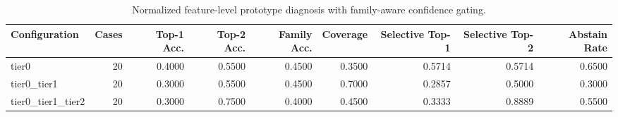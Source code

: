 \begin{table}[t]
\centering
\caption{Normalized feature-level prototype diagnosis with family-aware confidence gating.}
\label{tab:dice_stressor_hierarchical_diagnosis}
\footnotesize
\begin{tabular}{lrrrrrrrr}
\toprule
Configuration & Cases & Top-1 Acc. & Top-2 Acc. & Family Acc. & Coverage & Selective Top-1 & Selective Top-2 & Abstain Rate \\
\midrule
tier0 & 20 & 0.4000 & 0.5500 & 0.4500 & 0.3500 & 0.5714 & 0.5714 & 0.6500 \\
tier0_tier1 & 20 & 0.3000 & 0.5500 & 0.4500 & 0.7000 & 0.2857 & 0.5000 & 0.3000 \\
tier0_tier1_tier2 & 20 & 0.3000 & 0.7500 & 0.4000 & 0.4500 & 0.3333 & 0.8889 & 0.5500 \\
\bottomrule
\end{tabular}

\end{table}
